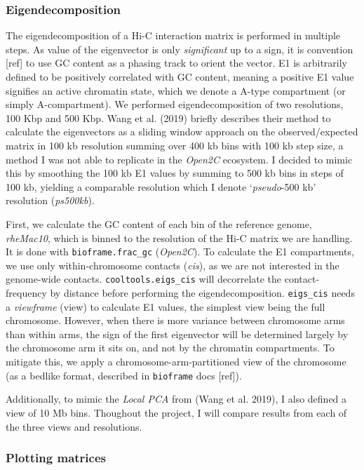 \documentclass[
  11pt,
  a4paper,
]{scrbook}
\let\oldemph\emph
\renewcommand\emph[1]{\oldemph{\color{gray}#1}}
\begin{document}
\subsubsection{Eigendecomposition}\label{sec-methods-eigendecomposition}

The eigendecomposition of a Hi-C interaction matrix is performed in
multiple steps. As value of the eigenvector is only \emph{significant}
up to a sign, it is convention {[}ref{]} to use GC content as a phasing
track to orient the vector. E1 is arbitrarily defined to be positively
correlated with GC content, meaning a positive E1 value signifies an
active chromatin state, which we denote a A-type compartment (or simply
A-compartment). We performed eigendecomposition of two resolutions, 100
Kbp and 500 Kbp. Wang et al. (2019) briefly describes their method to
calculate the eigenvectors as a sliding window approach on the
observed/expected matrix in 100 kb resolution summing over 400 kb bins
with 100 kb step size, a method I was not able to replicate in the
\emph{Open2C} ecosystem. I decided to mimic this by smoothing the 100 kb
E1 values by summing to 500 kb bins in steps of 100 kb, yielding a
comparable resolution which I denote `\emph{pseudo}-500 kb' resolution
(\emph{ps500kb}).

First, we calculate the GC content of each bin of the reference genome,
\emph{rheMac10}, which is binned to the resolution of the Hi-C matrix we
are handling. It is done with \texttt{bioframe.frac\_gc}
(\emph{Open2C}). To calculate the E1 compartments, we use only
within-chromosome contacts (\emph{cis}), as we are not interested in the
genome-wide contacts. \texttt{cooltools.eigs\_cis} will decorrelate the
contact-frequency by distance before performing the eigendecomposition.
\texttt{eigs\_cis} needs a \emph{viewframe} (view) to calculate E1
values, the simplest view being the full chromosome. However, when there
is more variance between chromosome arms than within arms, the sign of
the first eigenvector will be determined largely by the chromosome arm
it sits on, and not by the chromatin compartments. To mitigate this, we
apply a chromosome-arm-partitioned view of the chromosome (as a bedlike
format, described in \texttt{bioframe} docs {[}ref{]}).

Additionally, to mimic the \emph{Local PCA} from (Wang et al. 2019), I
also defined a view of 10 Mb bins. Thoughout the project, I will compare
results from each of the three views and resolutions.

\subsubsection{Plotting matrices}\label{plotting-matrices}
\end{document}
